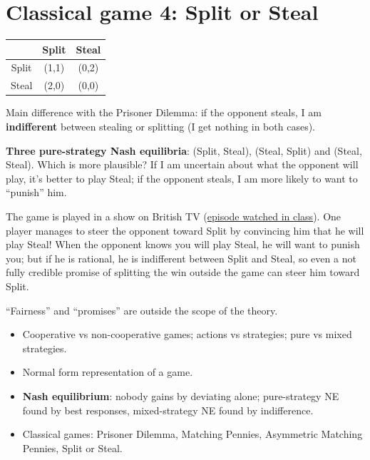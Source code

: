 \documentclass[11pt,a4paper,openany]{book}
\begin{document}
\section{Classical game 4: Split or Steal}

\begin{exbox}[title=Split or Steal]
\begin{center}
\begin{tabular}{c|cc}
 & Split & Steal \\ \hline
Split & (1,1) & (0,2) \\
Steal & (2,0) & (0,0)
\end{tabular}
\end{center}
Main difference with the Prisoner Dilemma: if the opponent steals, I am
\textbf{indifferent} between stealing or splitting (I get nothing in both cases).
\end{exbox}

\begin{propbox}[title=Equilibria]
\textbf{Three pure-strategy Nash equilibria}: (Split, Steal), (Steal, Split) and
(Steal, Steal). Which is more plausible? If I am uncertain about what the opponent will
play, it's better to play Steal; if the opponent steals, I am more likely to want to
``punish'' him.
\end{propbox}

\begin{exbox}[title=Split or Steal on British TV]
The game is played in a show on British TV
(\href{https://www.youtube.com/watch?v=S0qjK3TWZE8}{episode watched in class}). One player
manages to steer the opponent toward Split by convincing him that he will play Steal! When
the opponent knows you will play Steal, he will want to punish you; but if he is rational, he
is indifferent between Split and Steal, so even a not fully credible promise of splitting the
win outside the game can steer him toward Split.
\end{exbox}

\begin{warnbox}[title=Limits of the theory]
``Fairness'' and ``promises'' are outside the scope of the theory.
\end{warnbox}

\begin{keybox}[title=Summary]
\begin{itemize}
  \item Cooperative vs non-cooperative games; actions vs strategies; pure vs mixed
        strategies.
  \item Normal form representation of a game.
  \item \textbf{Nash equilibrium}: nobody gains by deviating alone; pure-strategy NE found
        by best responses, mixed-strategy NE found by indifference.
  \item Classical games: Prisoner Dilemma, Matching Pennies, Asymmetric Matching Pennies,
        Split or Steal.
\end{itemize}
\end{keybox}
\end{document}

